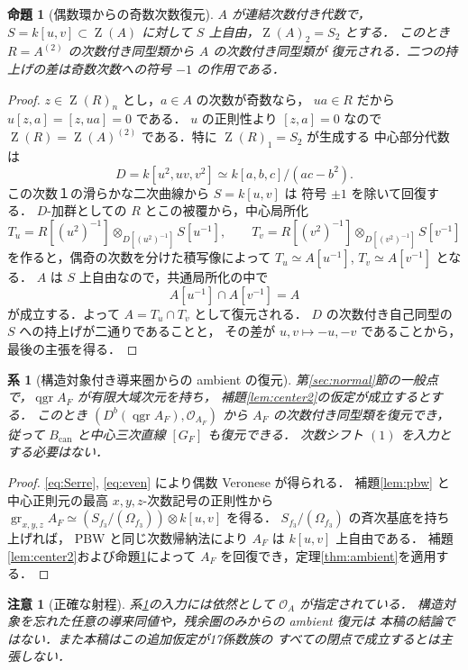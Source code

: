 \documentclass[11pt,a4paper]{ltjsarticle}
\numberwithin{equation}{section}
\newtheorem{proposition}[theorem]{命題}
\newtheorem{corollary}[theorem]{系}
\newtheorem{remark}[theorem]{注意}
\newcommand{\OO}{\mathcal O}
\newcommand{\gr}{\operatorname{gr}}
\newcommand{\qgr}{\operatorname{qgr}}
\newcommand{\Z}{\operatorname{Z}}
\begin{document}
\begin{proposition}[偶数環からの奇数次数復元]\label{prop:evenrecover}
$A$ が連結次数付き代数で，$S=k[u,v]\subset\Z(A)$ に対して
$S$ 上自由，$\Z(A)_2=S_2$ とする．
このとき $R=A^{(2)}$ の次数付き同型類から $A$ の次数付き同型類が
復元される．二つの持上げの差は奇数次数への符号 $-1$ の作用である．
\end{proposition}
\begin{proof}
$z\in\Z(R)_n$ とし，$a\in A$ の次数が奇数なら，
$ua\in R$ だから $u[z,a]=[z,ua]=0$ である．
$u$ の正則性より $[z,a]=0$ なので
$\Z(R)=\Z(A)^{(2)}$ である．特に $\Z(R)_1=S_2$ が生成する
中心部分代数は
\begin{equation}\label{eq:conic}
 D=k[u^2,uv,v^2]\simeq k[a,b,c]/(ac-b^2).
\end{equation}
この次数１の滑らかな二次曲線から $S=k[u,v]$ は
符号 $\pm1$ を除いて回復する．
$D$-加群としての $R$ とこの被覆から，中心局所化
\[
 T_u=R[(u^2)^{-1}]\otimes_{D[(u^2)^{-1}]}S[u^{-1}],\qquad
 T_v=R[(v^2)^{-1}]\otimes_{D[(v^2)^{-1}]}S[v^{-1}]
\]
を作ると，偶奇の次数を分けた積写像によって
$T_u\simeq A[u^{-1}]$, $T_v\simeq A[v^{-1}]$ となる．
$A$ は $S$ 上自由なので，共通局所化の中で
\[
 A[u^{-1}]\cap A[v^{-1}]=A
\]
が成立する．よって $A=T_u\cap T_v$ として復元される．
$D$ の次数付き自己同型の $S$ への持上げが二通りであることと，
その差が $u,v\mapsto -u,-v$ であることから，最後の主張を得る．
\end{proof}

\begin{corollary}[構造対象付き導来圏からの ambient の復元]\label{cor:Serre}
第\ref{sec:normal}節の一般点で，$\qgr A_F$ が有限大域次元を持ち，
補題\ref{lem:center2}の仮定が成立するとする．
このとき $(D^b(\qgr A_F),\OO_{A_F})$ から
$A_F$ の次数付き同型類を復元でき，従って
$B_{\mathrm{can}}$ と中心三次直線 $[G_F]$ も復元できる．
次数シフト $(1)$ を入力とする必要はない．
\end{corollary}
\begin{proof}
\eqref{eq:Serre}, \eqref{eq:even} により偶数 Veronese が得られる．
補題\ref{lem:pbw} と中心正則元の最高 $x,y,z$-次数記号の正則性から
$\gr_{x,y,z}A_F\simeq (S_{f_3}/(\Omega_{f_3}))\otimes k[u,v]$ を得る．
$S_{f_3}/(\Omega_{f_3})$ の斉次基底を持ち上げれば，
PBW と同じ次数帰納法により $A_F$ は $k[u,v]$ 上自由である．
補題\ref{lem:center2}および命題\ref{prop:evenrecover}によって
$A_F$ を回復でき，定理\ref{thm:ambient}を適用する．
\end{proof}

\begin{remark}[正確な射程]
系\ref{cor:Serre}の入力には依然として $\OO_A$ が指定されている．
構造対象を忘れた任意の導来同値や，残余圏のみからの ambient 復元は
本稿の結論ではない．また本稿はこの追加仮定が17係数族の
すべての閉点で成立するとは主張しない．
\end{remark}
\end{document}
